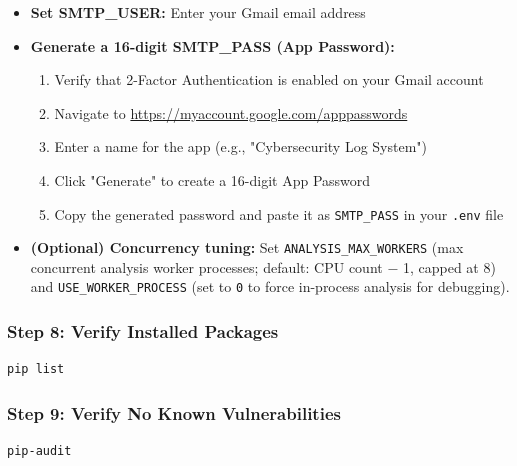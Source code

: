 \documentclass[12pt,a4paper]{article}
\begin{document}
\begin{itemize}
    \item \textbf{Set SMTP\_USER:} Enter your Gmail email address
    
    \item \textbf{Generate a 16-digit SMTP\_PASS (App Password):}
    \begin{enumerate}
        \item Verify that 2-Factor Authentication is enabled on your Gmail account
        \item Navigate to \url{https://myaccount.google.com/apppasswords}
        \item Enter a name for the app (e.g., "Cybersecurity Log System")
        \item Click "Generate" to create a 16-digit App Password
        \item Copy the generated password and paste it as \texttt{SMTP\_PASS} in your \texttt{.env} file
    \end{enumerate}

    \item \textbf{(Optional) Concurrency tuning:} Set \texttt{ANALYSIS\_MAX\_WORKERS}
    (max concurrent analysis worker processes; default: CPU count $-$ 1, capped at 8)
    and \texttt{USE\_WORKER\_PROCESS} (set to \texttt{0} to force in-process analysis
    for debugging).
\end{itemize}

\subsubsection{Step 8: Verify Installed Packages}

\begin{tcolorbox}[colback=gray!10!white, colframe=gray!70!black, arc=3pt, boxrule=0.5pt]
\begin{verbatim}
pip list
\end{verbatim}
\end{tcolorbox}

\subsubsection{Step 9: Verify No Known Vulnerabilities}

\begin{tcolorbox}[colback=gray!10!white, colframe=gray!70!black, arc=3pt, boxrule=0.5pt]
\begin{verbatim}
pip-audit
\end{verbatim}
\end{tcolorbox}
\end{document}
